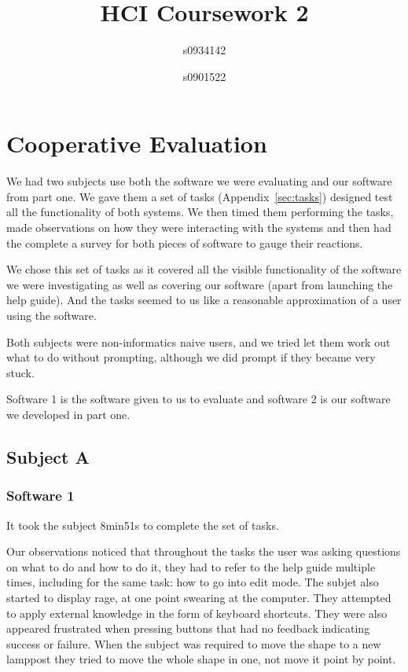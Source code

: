 \documentclass[a4paper,11pt,oneside]{article}
\begin{document}
\title{HCI Coursework 2}
\author{s0934142 \and s0901522}
\maketitle

\section{Cooperative Evaluation}
We had two subjects use both the software we were evaluating and our software from part one.  We gave them a set of tasks (Appendix~\ref{sec:tasks}) designed test all the functionality of both systems.  We then timed them performing the tasks, made observations on how they were interacting with the systems and then had the complete a survey for both pieces of software to gauge their reactions.

We chose this set of tasks as it covered all the visible functionality of the software we were investigating as well as covering our software (apart from launching the help guide).  And the tasks seemed to us like a reasonable approximation of a user using the software.

Both subjects were non-informatics naive users, and we tried let them work out what to do without prompting, although we did prompt if they became very stuck.

Software 1 is the software given to us to evaluate and software 2 is our software we developed in part one.

\subsection{Subject A}

\subsubsection{Software 1}
It took the subject 8min51s to complete the set of tasks. 

Our observations noticed that throughout the tasks the user was asking questions on what to do and how to do it, they had to refer to the help guide multiple times, including for the same task: how to go into edit mode.  The subjet also started to display rage, at one point swearing at the computer.  They attempted to apply external knowledge in the form of keyboard shortcuts.  They were also appeared frustrated when pressing buttons that had no feedback indicating success or failure.  When the subject was required to move the shape to a new lamppost they tried to move the whole shape in one, not move it point by point.
\end{document}
